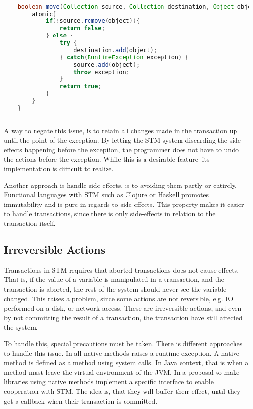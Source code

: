 \begin{lstlisting}[label=lst:stm_exception,
  caption={[Exceptions in Transactions]Exceptions in Transactions \cite[p. 3]{harris2005exceptions}},
  language=Java,  
  showspaces=false,
  showtabs=false,
  breaklines=true,
  showstringspaces=false,
  breakatwhitespace=true,
  commentstyle=\color{greencomments},
  keywordstyle=\color{bluekeywords},
  stringstyle=\color{redstrings},
  morekeywords={atomic, retry, orElse}]  % Start your code-block

	boolean move(Collection source, Collection destination, Object object){
		atomic{
			if(!source.remove(object)){
				return false;
			} else {
				try { 
					destination.add(object);
				} catch(RuntimeException exception) {
					source.add(object);
					throw exception;
				}
				return true;
			}
		}
	}
       
\end{lstlisting}

A way to negate this issue, is to retain all changes made in the transaction up until the point of the exception. By letting the \ac{STM} system discarding the side-effects happening before the exception, the programmer does not have to undo the actions before the exception. While this is a desirable feature, its implementation is difficult to realize\cite[p. 3]{harris2005exceptions}. 

Another approach is handle side-effects, is to avoiding them partly or entirely. Functional languages with \ac{STM} such as Clojure or Haskell promotes immutability and is pure in regards to side-effects. This property makes it easier to handle transactions, since there is only side-effects in relation to the transaction itself. 

\subsection{Irreversible Actions}
Transactions in \ac{STM} requires that aborted transactions does not cause effects. That is, if the value of a variable is manipulated in a transaction, and the transaction is aborted, the rest of the system should never see the variable changed. This raises a problem, since some actions are not reversible, e.g. \ac{IO} performed on a disk, or network access. These are irreversible actions, and even by not committing the result of a transaction, the transaction have still affected the system. 

To handle this, special precautions must be taken. There is different approaches to handle this issue. In \cite[p. 4]{harris2003language} all native methods raises a runtime exception. A native method is defined as a method using system calls. In Java context, that is when a method must leave the virtual environment of the \ac{JVM}. In \cite{harris2005exceptions} a proposal to make libraries using native methods implement a specific interface to enable cooperation with \ac{STM}. The idea is, that they will buffer their effect, until they get a callback when their transaction is committed. 

